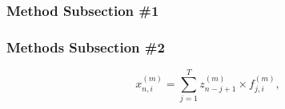 \subsubsection{Method Subsection \#1}
\label{sect:methods_sub1}

\blindtext
\blindtext

\subsubsection{Methods Subsection \#2}
\label{sect:methods_sub2}

\blindtext

\begin{equation}
x_{n,i}^{(m)} = \sum_{j=1}^{T}z_{n-j+1}^{(m)}\times f_{j,i}^{(m)},
\label{eq:conv}
\end{equation}

\blindtext
